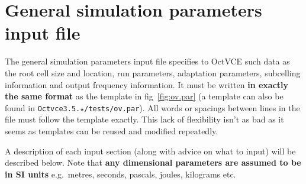 \documentclass[pdftex, 12pt, a4paper]{report}
\begin{document}
\section{General simulation parameters input file}\label{sec:ov_par}

The general simulation parameters input file specifies to OctVCE such data as the root cell size and location, run parameters,
adaptation parameters, subcelling information and output frequency information.  It must be written \textbf{in exactly the same format}
as the template in fig~\ref{fig:ov.par} (a template can also be found in \verb'Octvce3.5.'$\star$\verb'/tests/ov.par').  
All words or spacings between lines in the file must follow the template exactly.  This lack of flexibility isn't as bad as it
seems as templates can be reused and modified repeatedly.  

A description of each input section (along with advice on what to input) will be described below.  Note that \textbf{any dimensional parameters are assumed to be in SI units} e.g.\ metres, seconds, pascals, joules, kilograms etc.  
\end{document}
